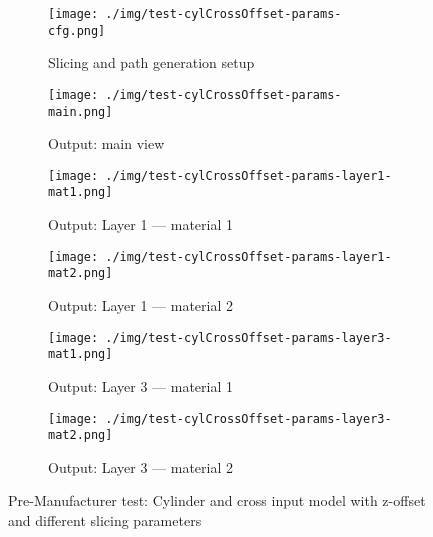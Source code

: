 \begin{figure}[htbp!]
  \centering
%
  \begin{subfigure}[t]{0.48\textwidth}
  \centering
  \texttt{[image: ./img/test-cylCrossOffset-params-cfg.png]}
  \caption{Slicing and path generation setup}%
  \label{fig:cyl-crossOffset-params-cfg}
\end{subfigure}
%
  \begin{subfigure}[t]{0.48\textwidth}
  \centering
  \texttt{[image: ./img/test-cylCrossOffset-params-main.png]}
  \caption{Output: main view}%
  \label{fig:cyl-crossOffset-params-main}
\end{subfigure}
%
  \begin{subfigure}[t]{0.48\textwidth}
  \centering
  \texttt{[image: ./img/test-cylCrossOffset-params-layer1-mat1.png]}
  \caption{Output: Layer 1 --- material 1}%
  \label{fig:cyl-crossOffset-params-layer1-mat1}
\end{subfigure}
%
  \begin{subfigure}[t]{0.48\textwidth}
  \centering
  \texttt{[image: ./img/test-cylCrossOffset-params-layer1-mat2.png]}
  \caption{Output: Layer 1 --- material 2}%
  \label{fig:cyl-crossOffset-params-layer1-mat2}
\end{subfigure}
%
  \begin{subfigure}[t]{0.48\textwidth}
  \centering
  \texttt{[image: ./img/test-cylCrossOffset-params-layer3-mat1.png]}
  \caption{Output: Layer 3 --- material 1}%
  \label{fig:cyl-crossOffset-params-layer3-mat1}
\end{subfigure}
%
  \begin{subfigure}[t]{0.48\textwidth}
  \centering
  \texttt{[image: ./img/test-cylCrossOffset-params-layer3-mat2.png]}
  \caption{Output: Layer 3 --- material 2}%
  \label{fig:cyl-crossOffset-params-layer3-mat2}
\end{subfigure}
%
  \caption[Cylinder and cross input model with z-offset and different slicing parameters]{Pre-Manufacturer test: Cylinder and cross input model with z-offset
    and different slicing parameters}%
  \label{fig:test-cyl-crossOffset-params}
\end{figure}



